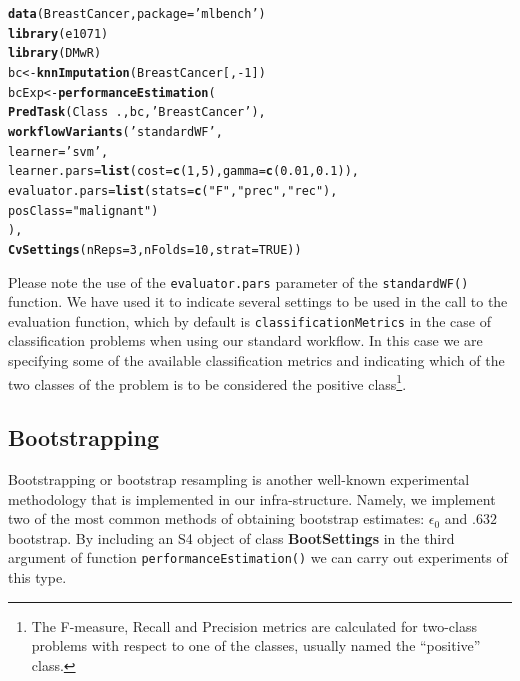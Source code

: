 \documentclass[10pt,a4paper]{article}\usepackage[]{graphicx}\usepackage[]{color}
\makeatletter
\newcommand{\hlnum}[1]{\textcolor[rgb]{0.686,0.059,0.569}{#1}}%
\newcommand{\hlstr}[1]{\textcolor[rgb]{0.192,0.494,0.8}{#1}}%
\newcommand{\hlopt}[1]{\textcolor[rgb]{0,0,0}{#1}}%
\newcommand{\hlstd}[1]{\textcolor[rgb]{0.345,0.345,0.345}{#1}}%
\newcommand{\hlkwb}[1]{\textcolor[rgb]{0.69,0.353,0.396}{#1}}%
\newcommand{\hlkwc}[1]{\textcolor[rgb]{0.333,0.667,0.333}{#1}}%
\newcommand{\hlkwd}[1]{\textcolor[rgb]{0.737,0.353,0.396}{\textbf{#1}}}%
\newenvironment{kframe}{%
 \def\at@end@of@kframe{}%
 \ifinner\ifhmode%
  \def\at@end@of@kframe{\end{minipage}}%
  \begin{minipage}{\columnwidth}%
 \fi\fi%
 \def\FrameCommand##1{\hskip\@totalleftmargin \hskip-\fboxsep
 \colorbox{shadecolor}{##1}\hskip-\fboxsep
     \hskip-\linewidth \hskip-\@totalleftmargin \hskip\columnwidth}%
 \MakeFramed {\advance\hsize-\width
   \@totalleftmargin\z@ \linewidth\hsize
   \@setminipage}}%
 {\par\unskip\endMakeFramed%
 \at@end@of@kframe}
\newenvironment{knitrout}{}{} %
\makeatother
\begin{document}
\begin{knitrout}
\color{fgcolor}\begin{kframe}
\begin{alltt}
\hlkwd{data}\hlstd{(BreastCancer,}\hlkwc{package}\hlstd{=}\hlstr{'mlbench'}\hlstd{)}
\hlkwd{library}\hlstd{(e1071)}
\hlkwd{library}\hlstd{(DMwR)}
\hlstd{bc} \hlkwb{<-} \hlkwd{knnImputation}\hlstd{(BreastCancer[,}\hlopt{-}\hlnum{1}\hlstd{])}
\hlstd{bcExp} \hlkwb{<-} \hlkwd{performanceEstimation}\hlstd{(}
  \hlkwd{PredTask}\hlstd{(Class} \hlopt{~} \hlstd{.,bc,}\hlstr{'BreastCancer'}\hlstd{),}
  \hlkwd{workflowVariants}\hlstd{(}\hlstr{'standardWF'}\hlstd{,}
           \hlkwc{learner}\hlstd{=}\hlstr{'svm'}\hlstd{,}
           \hlkwc{learner.pars}\hlstd{=}\hlkwd{list}\hlstd{(}\hlkwc{cost}\hlstd{=}\hlkwd{c}\hlstd{(}\hlnum{1}\hlstd{,}\hlnum{5}\hlstd{),}\hlkwc{gamma}\hlstd{=}\hlkwd{c}\hlstd{(}\hlnum{0.01}\hlstd{,}\hlnum{0.1}\hlstd{)),}
           \hlkwc{evaluator.pars}\hlstd{=}\hlkwd{list}\hlstd{(}\hlkwc{stats}\hlstd{=}\hlkwd{c}\hlstd{(}\hlstr{"F"}\hlstd{,}\hlstr{"prec"}\hlstd{,}\hlstr{"rec"}\hlstd{),}
                               \hlkwc{posClass}\hlstd{=}\hlstr{"malignant"}\hlstd{)}
          \hlstd{),}
  \hlkwd{CvSettings}\hlstd{(}\hlkwc{nReps}\hlstd{=}\hlnum{3}\hlstd{,}\hlkwc{nFolds}\hlstd{=}\hlnum{10}\hlstd{,}\hlkwc{strat}\hlstd{=}\hlnum{TRUE}\hlstd{))}
\end{alltt}
\end{kframe}
\end{knitrout}


Please note the use of the \texttt{evaluator.pars} parameter of the
\texttt{standardWF()} function. We have used it to indicate several
settings to be used in the call to the evaluation function, which by
default is \texttt{classificationMetrics} in the case of
classification problems when using our standard workflow. In this case
we are specifying some of the available classification metrics and
indicating which of the two classes of the problem is to be considered
the positive class\footnote{The F-measure, Recall and Precision
  metrics are calculated for two-class problems with respect to one of
  the classes, usually named the ``positive'' class.}.

\subsection{Bootstrapping}

Bootstrapping or bootstrap resampling is another well-known
experimental methodology that is implemented in our
infra-structure. Namely, we implement two of the most common methods of obtaining bootstrap estimates: $\epsilon_0$ and $.632$ bootstrap.
By including an S4 object of class
\textbf{BootSettings} in the third argument of function
\texttt{performanceEstimation()} we can carry out experiments of this
type.
\end{document}
